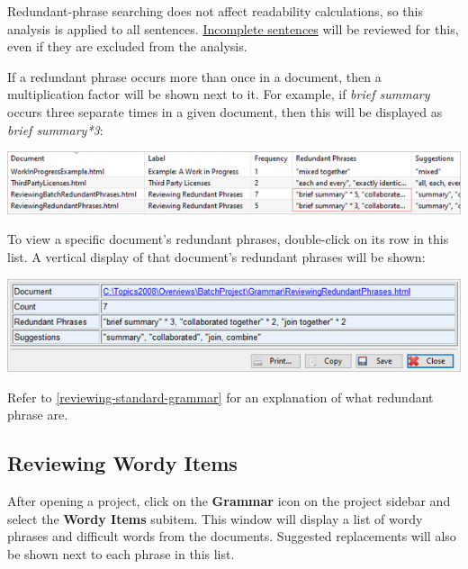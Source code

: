 \documentclass[
]{book}
\theoremstyle{definition}
\theoremstyle{definition}
\theoremstyle{definition}
\theoremstyle{definition}
\theoremstyle{remark}
\begin{document}
Redundant-phrase searching does not affect readability calculations, so this analysis is applied to all sentences. \protect\hyperlink{how-text-is-excluded}{Incomplete sentences} will be reviewed for this, even if they are excluded from the analysis.

If a redundant phrase occurs more than once in a document, then a multiplication factor will be shown next to it. For example, if \emph{brief summary} occurs three separate times in a given document, then this will be displayed as \emph{brief summary*3}:

\includegraphics{Images/batchredundantphrasesmultiple.png}

To view a specific document's redundant phrases, double-click on its row in this list. A vertical display of that document's redundant phrases will be shown:

\includegraphics{Images/batchredundantphrasesviewitem.png}

Refer to \ref{reviewing-standard-grammar} for an explanation of what redundant phrase are.

\hypertarget{reviewing-batch-wordiness}{%
\subsection*{Reviewing Wordy Items}\label{reviewing-batch-wordiness}}

After opening a project, click on the \textbf{Grammar} icon on the project sidebar and select the \textbf{Wordy Items} subitem. This window will display a list of wordy phrases and difficult words from the documents. Suggested replacements will also be shown next to each phrase in this list.
\end{document}
